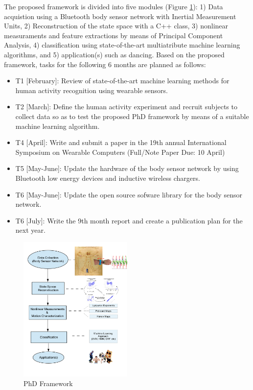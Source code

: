 \documentclass{sigchi}
\begin{document}
The proposed framework is divided into five modules (Figure \ref{fig:proposedapproach}): 
1) Data acquistion using a Bluetooth body sensor network with Inertial Measurement Units, 
2) Reconstruction of the state space with a C++ class, 
3) nonlinear measuraments and feature extractions by means of Principal Component
Analysis, 
4) classification using state-of-the-art multiatribute machine learning algorithms, 
and  5) application(s) such as dancing. 
Based on the proposed framework, 
tasks for the following 6 months are planned as follows:
\begin{itemize}
\item T1 [February]: Review of state-of-the-art machine learning methods 
for human activity recognition using wearable sensors.
\item T2 [March]: Define the human activity experiment and recruit subjects 
to collect data so as to test the proposed PhD framework by means of a suitable
machine learning algorithm.
\item T4 [April]: Write and submit a paper in the 19th annual International Symposium
on Wearable Computers (Full/Note Paper Due: 10 April)
\item T5 [May-June]: Update the hardware of the body sensor network by using
Bluetooth low energy devices and inductive wireless chargers. 
\item T6 [May-June]: Update the open source sofware library for the body sensor
network.
\item T6 [July]: Write the 9th month report and create a publication
plan for the next year.
\end{itemize}

\begin{figure}[htbp!] 
\centering    
\includegraphics[width=0.5\textwidth]{proposedapproach_v1}
\caption[PA]{PhD Framework}
\label{fig:proposedapproach}
\end{figure}
\end{document}
